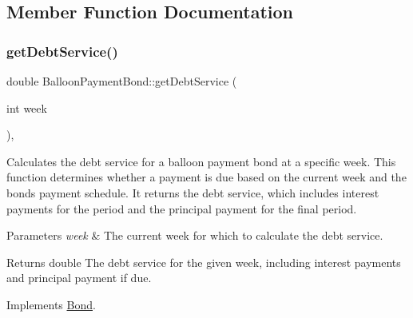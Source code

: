 \subsection{Member Function Documentation}
\mbox{\label{classBalloonPaymentBond_a8648a2ae688f90a3b2e6689711c22b9d}} 
\subsubsection{\texorpdfstring{get\+Debt\+Service()}{getDebtService()}}
{\footnotesize\ttfamily double Balloon\+Payment\+Bond\+::get\+Debt\+Service (\begin{DoxyParamCaption}\item[{int}]{week }\end{DoxyParamCaption})\hspace{0.3cm}{\ttfamily [override]}, {\ttfamily [virtual]}}



Calculates the debt service for a balloon payment bond at a specific week. This function determines whether a payment is due based on the current week and the bond\textquotesingle{}s payment schedule. It returns the debt service, which includes interest payments for the period and the principal payment for the final period. 


\begin{DoxyParams}{Parameters}
{\em week} & The current week for which to calculate the debt service.\\
\hline
\end{DoxyParams}
\begin{DoxyReturn}{Returns}
double The debt service for the given week, including interest payments and principal payment if due. 
\end{DoxyReturn}


Implements \mbox{\hyperlink{classBond_a98d8ecaf4b36319674ebd220598996bc}{Bond}}.

\mbox{\label{classBalloonPaymentBond_abbfaae70e003f057ec842d3889138345}} 
